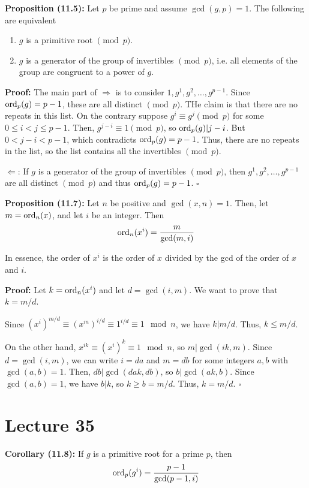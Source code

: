 \documentclass{article}
\newcommand*{\qed}{\hfill$\square$}%
\begin{document}
\textbf{Proposition (11.5):} Let $p$ be prime and assume $\gcd(g,p)=1$. The following are equivalent \begin{enumerate}
    \item $g$ is a primitive root $\pmod p$.
    \item $g$ is a generator of the group of invertibles $\pmod p$, i.e. all elements of the group are congruent to a power of $g$.
\end{enumerate}

\textbf{Proof:} The main part of $\Rightarrow$ is to consider $1, g^1, g^2, \dots, g^{p-1}$. Since $\text{ord}_p(g)=p-1$, these are all distinct $\pmod p$. THe claim is that there are no repeats in this list. On the contrary suppose $g^i\equiv g^j\pmod p$ for some $0\leq i<j\leq p-1$. Then, $g^{j-i}\equiv 1\pmod p$, so $\text{ord}_p(g)|j-i$. But $0<j-i<p-1$, which contradicts $\text{ord}_p(g)=p-1$. Thus, there are no repeats in the list, so the list contains all the invertibles $\pmod p$.

$\Leftarrow$: If $g$ is a generator of the group of invertibles $\pmod p$, then $g^1, g^2, \dots, g^{p-1}$ are all distinct $\pmod p$ and thus $\text{ord}_p(g)=p-1$. \qed

\textbf{Proposition (11.7):} Let $n$ be positive and $\gcd(x,n)=1$. Then, let $m=\text{ord}_n(x)$, and let $i$ be an integer. Then \begin{align*}
    \text{ord}_n(x^i)=\frac{m}{\gcd(m,i)}
\end{align*}

In essence, the order of $x^i$ is the order of $x$ divided by the gcd of the order of $x$ and $i$.

\textbf{Proof:} Let $k=\text{ord}_n(x^i)$ and let $d=\gcd(i,m)$. We want to prove that $k=m/d$. 

Since $(x^i)^{m/d}\equiv (x^m)^{i/d}\equiv 1^{i/d}\equiv 1\mod n$, we have $k|m/d$. Thus, $k\leq m/d$. 

On the other hand, $x^{ik}\equiv (x^i)^k\equiv 1\mod n$, so $m|\gcd(ik,m)$. Since $d=\gcd(i,m)$, we can write $i=da$ and $m=db$ for some integers $a,b$ with $\gcd(a,b)=1$. Then, $db|\gcd(dak,db)$, so $b|\gcd(ak,b)$. Since $\gcd(a,b)=1$, we have $b|k$, so $k\geq b=m/d$. Thus, $k=m/d$. \qed

\section{Lecture 35}

\textbf{Corollary (11.8):} If $g$ is a primitive root for a prime $p$, then \begin{align*}
    \text{ord}_p(g^i)=\frac{p-1}{\gcd(p-1,i)}
\end{align*}
\end{document}
